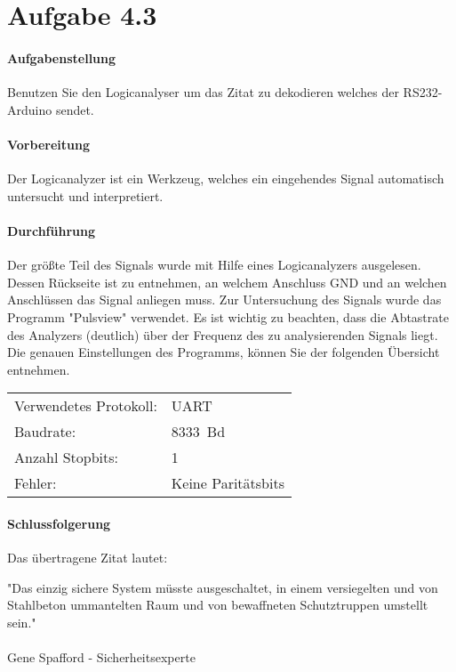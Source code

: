 \section{Aufgabe 4.3}
\paragraph{Aufgabenstellung}
Benutzen Sie den Logicanalyser um das Zitat zu dekodieren welches der RS232-Arduino sendet.

\paragraph{Vorbereitung}
Der Logicanalyzer ist ein Werkzeug, welches ein eingehendes Signal automatisch untersucht und interpretiert.

\paragraph{Durchführung}
Der größte Teil des Signals wurde mit Hilfe eines Logicanalyzers ausgelesen. Dessen Rückseite ist zu entnehmen, an welchem Anschluss GND und an welchen Anschlüssen das Signal anliegen muss. Zur Untersuchung des Signals wurde das Programm "Pulsview" verwendet. Es ist wichtig zu beachten, dass die Abtastrate des Analyzers (deutlich) über der Frequenz des zu analysierenden Signals liegt. Die genauen Einstellungen des Programms, können Sie der folgenden Übersicht entnehmen. \\

\begin{tabular}{ll}
	Verwendetes Protokoll: & UART       \\
	Baudrate:              & \SI{8333}{Bd} \\
	Anzahl Stopbits:       & 1          \\
	Fehler:                & Keine Paritätsbits       \\
\end{tabular}

\paragraph{Schlussfolgerung}
Das übertragene Zitat lautet:
\begin{center}
	\begin{minipage}{13cm}
		"Das einzig sichere System müsste ausgeschaltet, in einem versiegelten und von Stahlbeton ummantelten Raum und von bewaffneten Schutztruppen umstellt sein." \\\\
		Gene Spafford - Sicherheitsexperte
	\end{minipage}
\end{center}

